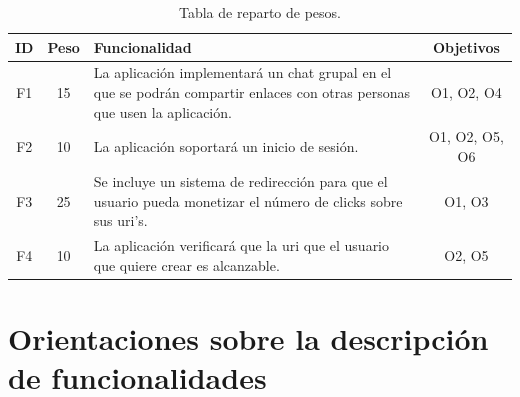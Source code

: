 \documentclass{article}
\begin{document}
\begin{table}[hbtp]
    \footnotesize
    \centering
    \settowidth{}
    \setlength\extrarowheight{5pt}
    \begin{tabulary}{\textwidth}{ C C L C}
        \textbf{ID} & 
        \textbf{Peso} & 
        \textbf{Funcionalidad} & 
        \textbf{Objetivos}\\
    \hline
    \hline
        F1 & 
        15 & 
        La aplicación implementará un chat grupal en el que se podrán compartir enlaces con otras personas que usen la aplicación. &
        O1, O2, O4\\
    \hline  
        F2 &
        10 &
        La aplicación soportará un inicio de sesión. &
        O1, O2, O5, O6\\
    \hline
        F3 &
        25 &
        Se incluye un sistema de redirección para que el usuario pueda monetizar el número de clicks sobre sus uri's. &
        O1, O3\\
    \hline
        F4 &
        10 &
        La aplicación verificará que la uri que el usuario que quiere crear es alcanzable. &
        O2, O5

    \end{tabulary}
    \caption{Tabla de reparto de pesos.}
\end{table}

\pagebreak

\section*{Orientaciones sobre la descripción de funcionalidades}
\end{document}
